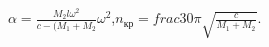 $\alpha=\frac{M_{2}l\omega^2}{c-(M_{1}+M_{2}}\omega^2$,$n_{кр}=frac{30}{\pi}\sqrt{\frac{c}{M_{1}+M_{2}}}$.